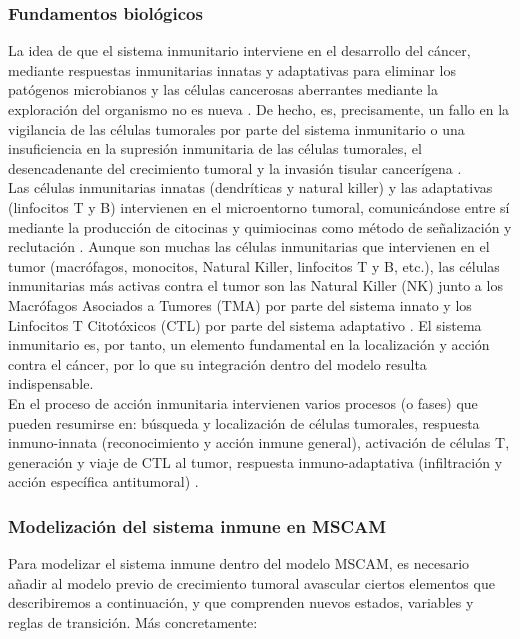 \subsubsection{Fundamentos biológicos}

La idea de que el sistema inmunitario interviene en el desarrollo del cáncer, mediante  respuestas inmunitarias innatas y adaptativas para eliminar los patógenos microbianos y las células cancerosas aberrantes mediante la exploración del organismo no es nueva \cite{Burkholder2014}. De hecho, es, precisamente, un fallo en la vigilancia de las células tumorales por parte del sistema inmunitario o una insuficiencia en la supresión inmunitaria de las células tumorales, el desencadenante del crecimiento tumoral y la invasión tisular cancerígena \cite{Weinberg1996, Kleinsmith2001}.\\

Las células inmunitarias innatas (dendríticas y natural killer) y las adaptativas (linfocitos T y B) intervienen en el microentorno tumoral, comunicándose entre sí mediante la producción de citocinas y quimiocinas como método de señalización y reclutación \cite{Kuznetsov1994, dePillis2005, Chew2012}. Aunque son muchas las células inmunitarias que intervienen en el tumor (macrófagos, monocitos, Natural Killer, linfocitos T y B, etc.), las células inmunitarias más activas contra el tumor son las Natural Killer (NK) junto a los Macrófagos Asociados a Tumores (TMA) por parte del sistema innato y los Linfocitos T Citotóxicos (CTL) por parte del sistema adaptativo \cite{Grivennikov2010}. El sistema inmunitario es, por tanto, un elemento fundamental en la localización y acción contra el cáncer, por lo que su integración dentro del modelo resulta indispensable.\\

En el proceso de acción inmunitaria intervienen varios procesos (o fases) que pueden resumirse en: búsqueda y localización de células tumorales, respuesta inmuno-innata (reconocimiento y acción inmune general), activación de células T, generación y viaje de CTL al tumor, respuesta inmuno-adaptativa (infiltración y acción específica antitumoral) \cite{Charles2001}.

\subsubsection{Modelización del sistema inmune en MSCAM}

Para modelizar el sistema inmune dentro del modelo MSCAM, es necesario añadir al modelo previo de crecimiento tumoral avascular ciertos elementos que describiremos a continuación, y que comprenden nuevos estados, variables y reglas de transición. Más concretamente:\\

